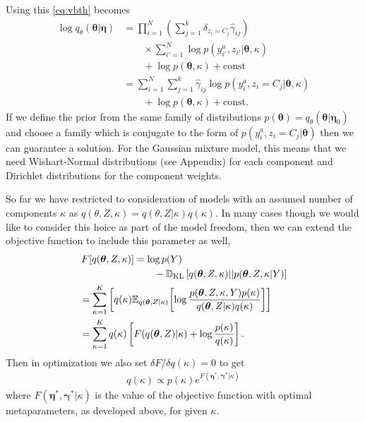 \documentclass[aps,showpacs,twocolumn,prd,superscriptaddress,nofootinbib]{revtex4}
\newcommand{\nn}{\nonumber}
\newcommand{\E}[1]{{\mathbb E}_{#1}\!}
\begin{document}
Using this \eqref{eq:vbth} becomes
\begin{align}
  \log q_\theta(\bm\theta|\bm\eta)
  &=\prod_{i=1}^N\left(\sum_{j=1}^k\delta_{z_i{=}C_j}\hat\gamma_{ij}\right)\nn\\
  &\qquad\times\sum_{i'=1}^N\log p(y_{i'}^a,z_{i'}|\bm\theta,\kappa)\nn\\
  &\qquad+\log p(\bm\theta,\kappa)+\mathrm{const}\nn\\
  &=\sum_{i=1}^N\sum_{j=1}^k\hat\gamma_{ij}\log p(y_i^a,z_i{=}C_j|\bm\theta,\kappa)\nn\\
  &\qquad+\log p(\bm\theta,\kappa)+\mathrm{const}.\label{eq:qthmix}
\end{align}
If we define the prior from the same family of distributions $p(\bm\theta)=q_\theta(\bm\theta|\bm\eta_0)$ and choose a family which is conjugate to the form of $p(y_i^a,z_i{=}C_j|\bm\theta)$ then we can guarantee a solution. For the Gaussian mixture model, this means that we need Wishart-Normal distributions (see Appendix) for each component and Dirichlet distributions for the component weights.

So far we have restricted to consideration of models with an assumed number of components $\kappa$ as $q(\theta,Z,\kappa)=q(\theta,Z|\kappa)q(\kappa)$.  In many cases though we would like to consider this hoice as part of the model freedom, then we can extend the objective function to include this parameter as well,
\begin{align*}
  F[q(\bm\theta,Z,\kappa)]\mkern-100mu &\mkern100mu=\log p(Y)\nn\\
  &\mkern100mu\qquad-\mathbb{D}_{\mathrm{KL}}\left[q(\bm\theta,Z,\kappa)||p(\bm\theta,Z,\kappa|Y)\right]\nn\\
  &=\sum_{\kappa=1}^K\left[q(\kappa)\E{q(\bm\theta,Z|\kappa)}\left[\log\frac{p(\bm\theta,Z,\kappa,Y)p(\kappa)}{q(\bm\theta,Z|\kappa)q(\kappa)}\right]\right]\nn\\
  &=\sum_{\kappa=1}^Kq(\kappa)\left[F(q(\bm\theta,Z)|\kappa)+\log\frac{p(\kappa)}{q(\kappa)}\right].
\end{align*}
Then in optimization we also set $\delta F/\delta q(\kappa)=0$ to get
\begin{align*}
    q(\kappa)\propto p(\kappa)e^{F(\bm\eta^*,\bm\gamma^*|\kappa)}
\end{align*}
where $F(\bm\eta^*,\bm\gamma^*|\kappa)$ is the value of the objective function with optimal metaparameters, as developed above, for given $\kappa$.
\end{document}
